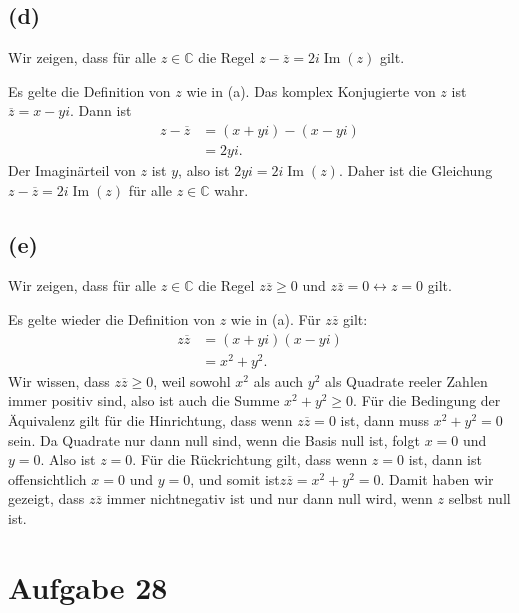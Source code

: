 \documentclass{article}
\theoremstyle{definition}
\theoremstyle{remark}
\begin{document}
\subsection*{(d)}
Wir zeigen, dass für alle \( z \in \mathbb{C} \) die Regel \( z - \overline{z} = 2i \operatorname{Im}(z) \) gilt.

\proof Es gelte die Definition von \( z \) wie in (a).
Das komplex Konjugierte von \( z \) ist \( \overline{z} = x - yi \). Dann ist
\begin{align*}
    z - \overline{z} & = (x + yi) - (x - yi) \\
                     & = 2yi.
\end{align*}
Der Imaginärteil von \( z \) ist \( y \), also ist \( 2yi = 2i \operatorname{Im}(z) \). Daher ist die Gleichung \( z - \overline{z} = 2i \operatorname{Im}(z) \) für alle \( z \in \mathbb{C} \) wahr.
\endproof

\subsection*{(e)}
Wir zeigen, dass für alle \( z \in \mathbb{C} \) die Regel \( z \overline{z} \ge 0 \) und \( z \overline{z} = 0 \leftrightarrow z = 0\) gilt.

\proof Es gelte wieder die Definition von \( z \) wie in (a).
Für \( z \overline{z} \) gilt:
\begin{align*}
    z \overline{z} & = (x + yi)(x - yi) \\
                   & = x^2 + y^2.
\end{align*}
Wir wissen, dass \( z \overline{z} \ge 0\), weil sowohl \( x^2 \) als auch \( y^2 \) als Quadrate reeler Zahlen immer positiv sind, also ist auch die Summe \( x^2 + y^2 \ge 0 \).
Für die Bedingung der Äquivalenz gilt für die Hinrichtung, dass wenn \( z \overline{z} = 0 \) ist, dann muss \( x^2 + y^2 = 0\) sein. Da Quadrate nur dann null sind, wenn die Basis null ist, folgt \( x = 0 \) und \( y = 0 \). Also ist \( z = 0 \).
Für die Rückrichtung gilt, dass wenn \( z = 0 \) ist, dann ist offensichtlich \( x = 0 \) und \( y = 0 \), und somit ist\( z \overline{z} = x^2 + y^2 = 0 \).
Damit haben wir gezeigt, dass \( z \overline{z} \) immer nichtnegativ ist und nur dann null wird, wenn \( z \) selbst null ist.
\endproof

\section*{Aufgabe 28}
\end{document}
